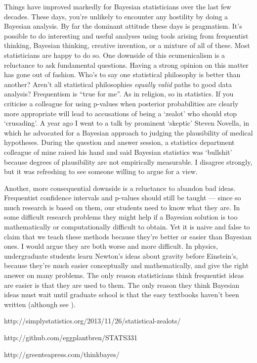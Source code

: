 \documentclass[a4paper, 12pt]{article}
\begin{document}
Things have improved markedly for Bayesian statisticians over the last few
decades. These days, you're unlikely to encounter any hostility by doing
a Bayesian analysis. By far the dominant attitude these days
is pragmatism. It's possible to do interesting and useful analyses using tools
arising from frequentist thinking, Bayesian thinking, creative invention, or
a mixture of all of these. Most statisticians are happy to do so.
One downside of this ecumenicalism is a reluctance to ask fundamental
questions. Having a strong opinion on this matter has gone out of fashion.
Who's to say one statistical philosophy is better than
another? Aren't all statistical philosophies {\it equally valid} paths to good
data analysis? Frequentism is ``true for me''. As in religion, so in statistics.
If you criticise a colleague for using p-values when posterior probabilities
are clearly more appropriate will lead to accusations of being a `zealot'
\citep{simply_statistics} who should stop `crusading'.
A year ago I went to a talk by prominent `skeptic' Steven Novella, in which
he advocated for a Bayesian approach to judging the plausibility of medical
hypotheses. During the question and answer session, a statistics department colleague of mine raised his hand and said Bayesian statistics was `bullshit' because degrees of plausibility are not empirically measurable. I disagree
strongly, but it was refreshing to see someone willing to argue for a view.

Another, more consequential downside is a reluctance to abandon bad ideas.
Frequentist confidence intervals and p-values should still be taught
--- since so much research is based on them, our students need to know what
they are. In some difficult research problems they might help if a Bayesian solution is too mathematically or computationally difficult to obtain.
Yet it is naive and false to claim that we teach these methods because they're
better or easier than Bayesian ones. I would argue they are both worse and
more difficult. In physics, undergraduate students learn Newton's ideas about
gravity before Einstein's, because they're much easier conceptually and
mathematically, and give the right answer on many problems. The only reason
statisticians think frequentist ideas are easier is that they are used to them.
The only reason they think Bayesian ideas must wait until graduate school is
that the easy textbooks haven't been written (although see
\citep{331, downey}).

\begin{thebibliography}{999} %
http://simplystatistics.org/2013/11/26/statistical-zealots/

http://github.com/eggplantbren/STATS331

http://greenteapress.com/thinkbayes/

\end{thebibliography}
\end{document}
